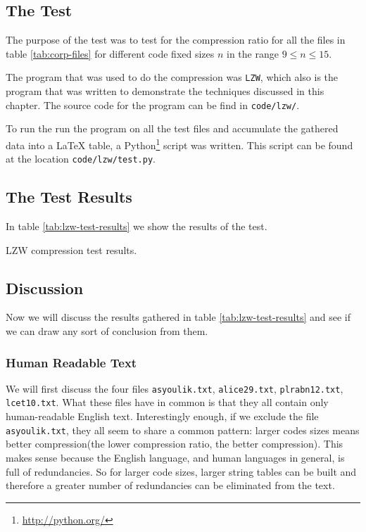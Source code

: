 \subsection{The Test}

The purpose of the test was to test for the compression ratio for all
the files in table \ref{tab:corp-files} for different code fixed sizes
$n$ in the range $9 \leq n \leq 15$.

The program that was used to do the compression was \verb|LZW|, which
also is the program that was written to demonstrate the techniques
discussed in this chapter. The source code for the program can be find
in \verb|code/lzw/|.

To run the run the program on all the test files and accumulate the
gathered data into a \LaTeX{} table, a Python\footnote{\url{http://python.org/}} script was written. This
script can be found at the location \verb|code/lzw/test.py|.

\subsection{The Test Results}

In table \ref{tab:lzw-test-results} we show the results of the test.

\begin{table}
  \scriptsize
  \centering
  
  \caption{LZW compression test results.}
  \label{tab:lzw-test-results}
\end{table}

\subsection{Discussion}

Now we will discuss the results gathered in table
\ref{tab:lzw-test-results} and see if we can draw any sort of
conclusion from them.

\subsubsection{Human Readable Text}

We will first discuss the four files \verb|asyoulik.txt|,
\verb|alice29.txt|, \verb|plrabn12.txt|, \verb|lcet10.txt|. What these
files have in common is that they all contain only human-readable
English text. Interestingly enough, if we exclude the file
\verb|asyoulik.txt|, they all seem to share a common pattern: larger
codes sizes means better compression(the lower compression ratio, the
better compression). This makes sense because the English language,
and human languages in general, is full of redundancies. So for larger
code sizes, larger string tables can be built and therefore a greater
number of redundancies can be eliminated from the text.

